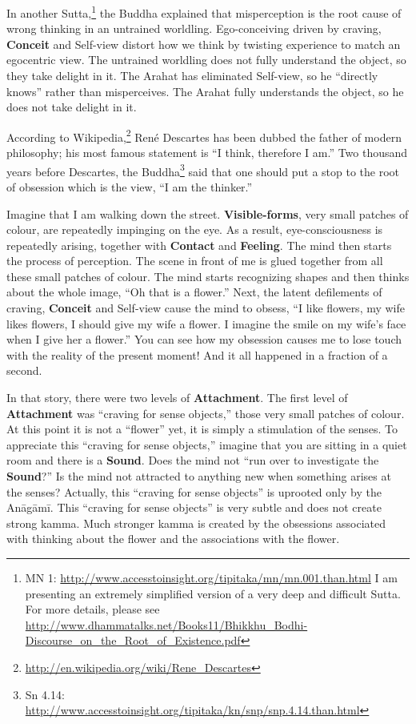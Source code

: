 
In another Sutta,\footnote{MN 1: \url{http://www.accesstoinsight.org/tipitaka/mn/mn.001.than.html} I am presenting an extremely simplified version of a very deep and difficult Sutta. For more details, please see \url{http://www.dhammatalks.net/Books11/Bhikkhu_Bodhi-Discourse_on_the_Root_of_Existence.pdf}} the Buddha explained that misperception is the root cause of wrong thinking in an untrained worldling. Ego-conceiving driven by craving, \textbf{Conceit} and Self-view distort how we think by twisting experience to match an egocentric view. The untrained worldling does not fully understand the object, so they take delight in it. The Arahat has eliminated Self-view, so he “directly knows” rather than misperceives. The Arahat fully understands the object, so he does not take delight in it.

According to Wikipedia,\footnote{\url{http://en.wikipedia.org/wiki/Rene_Descartes}} René Descartes has been dubbed the father of modern philosophy; his most famous statement is “I think, therefore I am.” Two thousand years before Descartes, the Buddha\footnote{Sn 4.14: \url{http://www.accesstoinsight.org/tipitaka/kn/snp/snp.4.14.than.html}} said that one should put a stop to the root of obsession which is the view, “I am the thinker.”

Imagine that I am walking down the street. \textbf{Visible-forms}, very small patches of colour, are repeatedly impinging on the eye. As a result, eye-consciousness is repeatedly arising, together with \textbf{Contact} and \textbf{Feeling}. The mind then starts the process of perception. The scene in front of me is glued together from all these small patches of colour. The mind starts recognizing shapes and then thinks about the whole image, “Oh that is a flower.” Next, the latent defilements of craving, \textbf{Conceit} and Self-view cause the mind to obsess, “I like flowers, my wife likes flowers, I should give my wife a flower. I imagine the smile on my wife’s face when I give her a flower.” You can see how my obsession causes me to lose touch with the reality of the present moment! And it all happened in a fraction of a second.

In that story, there were two levels of \textbf{Attachment}. The first level of \textbf{Attachment} was “craving for sense objects,” those very small patches of colour. At this point it is not a “flower” yet, it is simply a stimulation of the senses. To appreciate this “craving for sense objects,” imagine that you are sitting in a quiet room and there is a \textbf{Sound}. Does the mind not “run over to investigate the \textbf{Sound}?” Is the mind not attracted to anything new when something arises at the senses? Actually, this “craving for sense objects” is uprooted only by the Anāgāmī. This “craving for sense objects” is very subtle and does not create strong kamma. Much stronger kamma is created by the obsessions associated with thinking about the flower and the associations with the flower.

